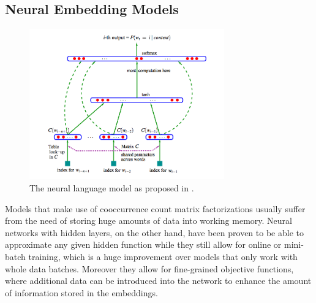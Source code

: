 \documentclass[11pt]{article}
\begin{document}
\subsection{Neural Embedding Models}
\begin{figure}[t]
\centering
\includegraphics[width=0.75\textwidth]{bengio2006network}
\caption{The neural language model as proposed in \cite{bengio2003neural}.}
\label{fig:bengio2006network}
\end{figure}
Models that make use of  cooccurrence count matrix factorizations usually suffer from the need of storing huge amounts of data into working memory. Neural networks with hidden layers, on the other hand, have been proven to be able to approximate any given hidden function while they still allow for online or mini-batch training, which is a huge improvement over models that only work with whole data batches. Moreover they allow for fine-grained objective functions, where additional data can be introduced into the network to enhance the amount of information stored in the embeddings.
\end{document}
